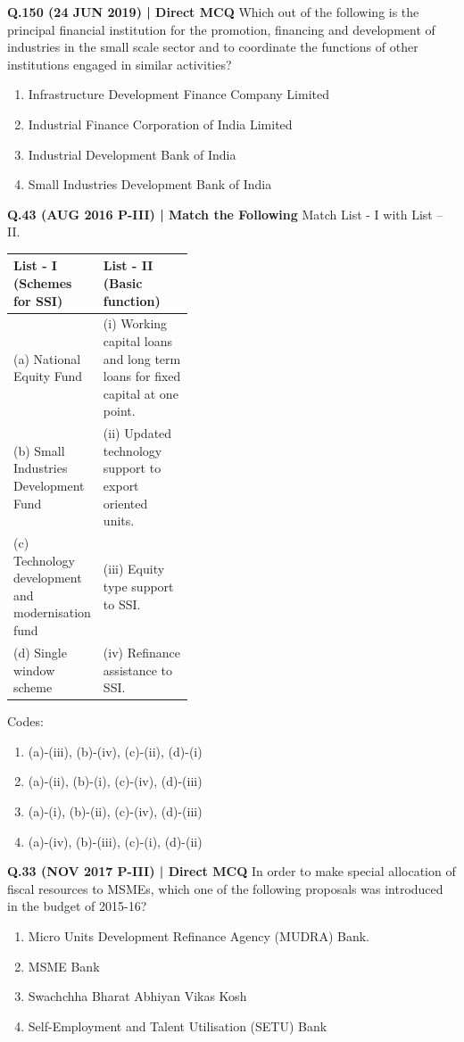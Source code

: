 \documentclass{article}
\begin{document}
\textbf{Q.150 (24 JUN 2019) | Direct MCQ}
Which out of the following is the principal financial institution for the promotion, financing and development of industries in the small scale sector and to coordinate the functions of other institutions engaged in similar activities?
\begin{enumerate}[label=(\arabic*)]
    \item Infrastructure Development Finance Company Limited
    \item Industrial Finance Corporation of India Limited
    \item Industrial Development Bank of India
    \item Small Industries Development Bank of India
\end{enumerate}

\textbf{Q.43 (AUG 2016 P-III) | Match the Following}
Match List - I with List – II.
\begin{tabularx}{\linewidth}{@{} p{0.4\linewidth} X @{}}
    \toprule
    \textbf{List - I (Schemes for SSI)} & \textbf{List - II (Basic function)} \\
    \midrule
    (a) National Equity Fund & (i) Working capital loans and long term loans for fixed capital at one point. \\
    (b) Small Industries Development Fund & (ii) Updated technology support to export oriented units. \\
    (c) Technology development and modernisation fund & (iii) Equity type support to SSI. \\
    (d) Single window scheme & (iv) Refinance assistance to SSI. \\
    \bottomrule
\end{tabularx}
Codes:
\begin{enumerate}[label=(\arabic*)]
    \item (a)-(iii), (b)-(iv), (c)-(ii), (d)-(i)
    \item (a)-(ii), (b)-(i), (c)-(iv), (d)-(iii)
    \item (a)-(i), (b)-(ii), (c)-(iv), (d)-(iii)
    \item (a)-(iv), (b)-(iii), (c)-(i), (d)-(ii)
\end{enumerate}

\textbf{Q.33 (NOV 2017 P-III) | Direct MCQ}
In order to make special allocation of fiscal resources to MSMEs, which one of the following proposals was introduced in the budget of 2015-16?
\begin{enumerate}[label=(\arabic*)]
    \item Micro Units Development Refinance Agency (MUDRA) Bank.
    \item MSME Bank
    \item Swachchha Bharat Abhiyan Vikas Kosh
    \item Self-Employment and Talent Utilisation (SETU) Bank
\end{enumerate}
\end{document}

